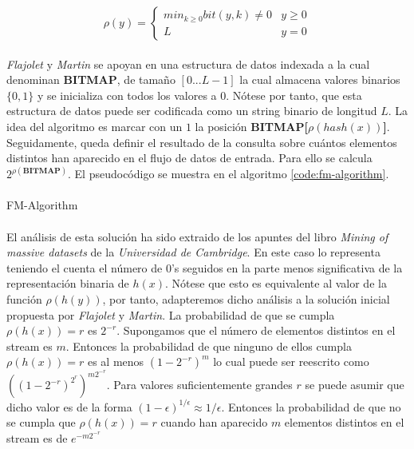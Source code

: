 \documentclass{subfiles}
\begin{document}
      \begin{equation}
      \label{eq:rho_function}
        \rho(y) =
          \begin{cases}
            min_{k \geq 0} bit(y, k) \neq 0 & y \geq 0\\
            L & y =0
          \end{cases}
      \end{equation}

      \paragraph{}
      \emph{Flajolet} y \emph{Martin} se apoyan en una estructura de datos indexada a la cual denominan \textbf{BITMAP}, de tamaño $[0...L-1]$ la cual almacena valores binarios $\{ 0, 1\}$ y se inicializa con todos los valores a $0$. Nótese por tanto, que esta estructura de datos puede ser codificada como un string binario de longitud $L$. La idea del algoritmo es marcar con un $1$ la posición \textbf{BITMAP[$\rho(hash(x))$]}. Seguidamente, queda definir el resultado de la consulta sobre cuántos elementos distintos han aparecido en el flujo de datos de entrada. Para ello se calcula $2^{\rho(\textbf{BITMAP})}$. El pseudocódigo se muestra en el algoritmo \ref{code:fm-algorithm}.

      \paragraph{}
      \begin{algorithm}[h]
        \SetAlgoLined
        \caption{FM-Algorithm}
        \label{code:fm-algorithm}
      \end{algorithm}

      \paragraph{}
      El análisis de esta solución ha sido extraido de los apuntes del libro \emph{Mining of massive datasets} \cite{leskovec2014mining} de la \emph{Universidad de Cambridge}. En este caso lo representa teniendo el cuenta el número de $0$'s seguidos en la parte menos significativa de la representación binaria de $h(x)$. Nótese que esto es equivalente al valor de la función $\rho(h(y))$, por tanto, adapteremos dicho análisis a la solución inicial propuesta por \emph{Flajolet} y \emph{Martin}. La probabilidad de que se cumpla $\rho(h(x)) = r$ es $2^{-r}$. Supongamos que el número de elementos distintos en el stream es $m$. Entonces la probabilidad de que ninguno de ellos cumpla $\rho(h(x)) = r$ es al menos $(1- 2^{-r})^m$ lo cual puede ser reescrito como $((1- 2^{-r})^{2^r})^{m2^{-r}}$. Para valores suficientemente grandes $r$ se puede asumir que dicho valor es de la forma $(1-\epsilon)^{1/\epsilon} \approx 1/\epsilon$. Entonces la probabilidad de que no se cumpla que $\rho(h(x)) = r$ cuando han aparecido $m$ elementos distintos en el stream es de $e^{-m2^{-r}}$
\end{document}
